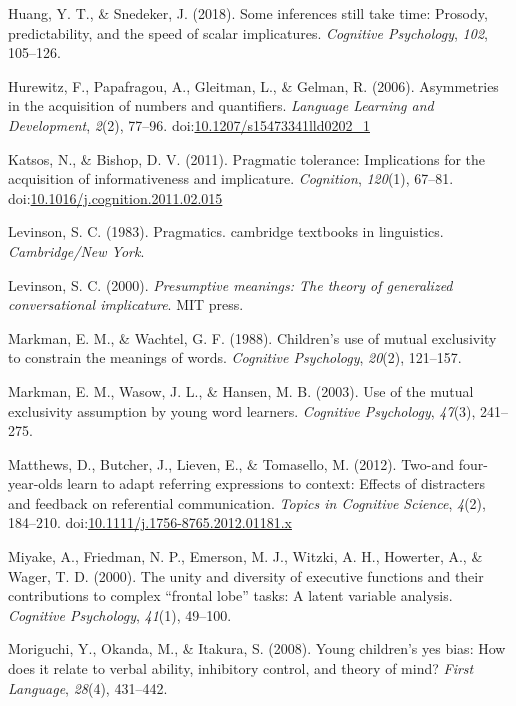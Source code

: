 \documentclass[mask,man]{apa6}
\begin{document}
\hypertarget{ref-huang2018}{}
Huang, Y. T., \& Snedeker, J. (2018). Some inferences still take time:
Prosody, predictability, and the speed of scalar implicatures.
\emph{Cognitive Psychology}, \emph{102}, 105--126.

\hypertarget{ref-hurewitz2006}{}
Hurewitz, F., Papafragou, A., Gleitman, L., \& Gelman, R. (2006).
Asymmetries in the acquisition of numbers and quantifiers.
\emph{Language Learning and Development}, \emph{2}(2), 77--96.
doi:\href{https://doi.org/10.1207/s15473341lld0202_1}{10.1207/s15473341lld0202\_1}

\hypertarget{ref-katsos2011}{}
Katsos, N., \& Bishop, D. V. (2011). Pragmatic tolerance: Implications
for the acquisition of informativeness and implicature.
\emph{Cognition}, \emph{120}(1), 67--81.
doi:\href{https://doi.org/10.1016/j.cognition.2011.02.015}{10.1016/j.cognition.2011.02.015}

\hypertarget{ref-levinson1983}{}
Levinson, S. C. (1983). Pragmatics. cambridge textbooks in linguistics.
\emph{Cambridge/New York}.

\hypertarget{ref-levinson2000}{}
Levinson, S. C. (2000). \emph{Presumptive meanings: The theory of
generalized conversational implicature}. MIT press.

\hypertarget{ref-markman1988children}{}
Markman, E. M., \& Wachtel, G. F. (1988). Children's use of mutual
exclusivity to constrain the meanings of words. \emph{Cognitive
Psychology}, \emph{20}(2), 121--157.

\hypertarget{ref-markman2003use}{}
Markman, E. M., Wasow, J. L., \& Hansen, M. B. (2003). Use of the mutual
exclusivity assumption by young word learners. \emph{Cognitive
Psychology}, \emph{47}(3), 241--275.

\hypertarget{ref-matthews2012}{}
Matthews, D., Butcher, J., Lieven, E., \& Tomasello, M. (2012). Two-and
four-year-olds learn to adapt referring expressions to context: Effects
of distracters and feedback on referential communication. \emph{Topics
in Cognitive Science}, \emph{4}(2), 184--210.
doi:\href{https://doi.org/10.1111/j.1756-8765.2012.01181.x}{10.1111/j.1756-8765.2012.01181.x}

\hypertarget{ref-miyake2000unity}{}
Miyake, A., Friedman, N. P., Emerson, M. J., Witzki, A. H., Howerter,
A., \& Wager, T. D. (2000). The unity and diversity of executive
functions and their contributions to complex ``frontal lobe'' tasks: A
latent variable analysis. \emph{Cognitive Psychology}, \emph{41}(1),
49--100.

\hypertarget{ref-moriguchi2008young}{}
Moriguchi, Y., Okanda, M., \& Itakura, S. (2008). Young children's yes
bias: How does it relate to verbal ability, inhibitory control, and
theory of mind? \emph{First Language}, \emph{28}(4), 431--442.
\end{document}
